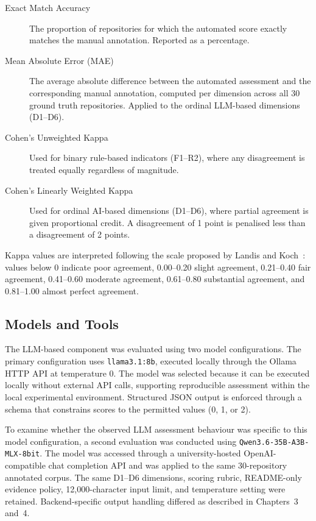 \begin{description}
\item[Exact Match Accuracy] The proportion of repositories for 
which the automated score exactly matches the manual annotation. 
Reported as a percentage.

\item[Mean Absolute Error (MAE)] The average absolute difference 
between the automated assessment and the corresponding manual 
annotation, computed per dimension across all 30 ground truth 
repositories. Applied to the ordinal LLM-based dimensions (D1--D6).

\item[Cohen's Unweighted Kappa] Used for binary rule-based 
indicators (F1--R2), where any disagreement is treated equally 
regardless of magnitude.

\item[Cohen's Linearly Weighted Kappa] Used for ordinal AI-based 
dimensions (D1--D6), where partial agreement is given proportional 
credit. A disagreement of 1 point is penalised less than a 
disagreement of 2 points.
\end{description}

Kappa values are interpreted following the scale proposed by
Landis and Koch~\cite{landis1977kappa}: values below 0 indicate poor
agreement, 0.00--0.20 slight agreement, 0.21--0.40 fair agreement,
0.41--0.60 moderate agreement, 0.61--0.80 substantial agreement,
and 0.81--1.00 almost perfect agreement.

\subsection{Models and Tools}

The LLM-based component was evaluated using two model configurations.
The primary configuration uses \texttt{llama3.1:8b}, executed locally
through the Ollama HTTP API at temperature 0. The model was selected
because it can be executed locally without external API calls,
supporting reproducible assessment within the local experimental
environment. Structured JSON output is enforced through a schema that
constrains scores to the permitted values (0, 1, or 2).

To examine whether the observed LLM assessment behaviour was specific
to this model configuration, a second evaluation was conducted using
\texttt{Qwen3.6-35B-A3B-MLX-8bit}. The model was accessed through a
university-hosted OpenAI-compatible chat completion API and was applied
to the same 30-repository annotated corpus. The same D1--D6 dimensions,
scoring rubric, README-only evidence policy, 12,000-character input
limit, and temperature setting were retained. Backend-specific output
handling differed as described in Chapters~3 and~4.

